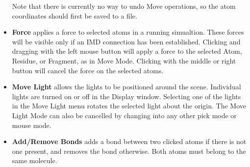 \begin{itemize}
Note that there is currently no way to undo Move operations, so the 
atom coordinates should first be saved to a file. 

\item{\bf Force} applies a force to selected atoms in a running simualtion. 
These forces will
be visible only if an IMD connection has been established.  Clicking and
dragging with the left mouse button will apply a force to the selected Atom,
Residue, or Fragment, as in Move Mode.  Clicking with the middle or right
button will cancel the force on the selected atoms.

\item{\bf Move Light} allows the lights to be positioned around the scene.  
Individual lights are turned on or off in the Display window.  Selecting
one of the lights in the Move Light menu rotates the selected light about
the origin. The Move Light Mode can also be cancelled by changing into any 
other pick mode or mouse mode.

\item {\bf Add/Remove Bonds} adds a bond between two clicked atoms if there is
not one present, and removes the bond otherwise. Both atoms must belong to the
same molecule.

\end{itemize}
 

 


